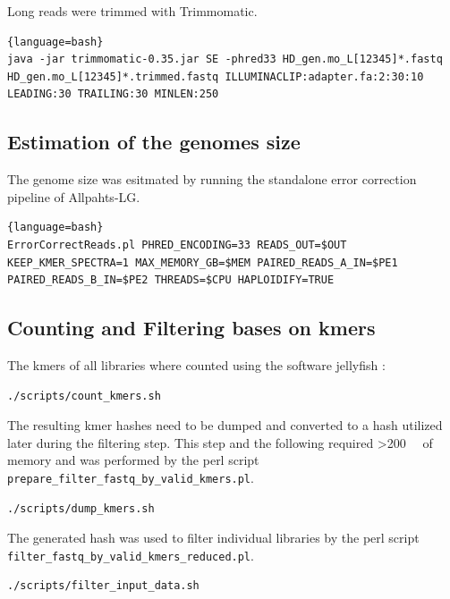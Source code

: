 \documentclass[12pt,a4paper]{scrartcl}
\begin{document}
Long reads were trimmed with Trimmomatic.

\begin{lstlisting}{language=bash}
java -jar trimmomatic-0.35.jar SE -phred33 HD_gen.mo_L[12345]*.fastq HD_gen.mo_L[12345]*.trimmed.fastq ILLUMINACLIP:adapter.fa:2:30:10 LEADING:30 TRAILING:30 MINLEN:250
\end{lstlisting}

\subsection*{Estimation of the genomes size}

The genome size was esitmated by running the standalone error correction pipeline of Allpahts-LG.

\begin{lstlisting}{language=bash}
ErrorCorrectReads.pl PHRED_ENCODING=33 READS_OUT=$OUT KEEP_KMER_SPECTRA=1 MAX_MEMORY_GB=$MEM PAIRED_READS_A_IN=$PE1 PAIRED_READS_B_IN=$PE2 THREADS=$CPU HAPLOIDIFY=TRUE
\end{lstlisting}

\subsection*{Counting and Filtering bases on kmers}

The kmers of all libraries where counted using the software jellyfish \parencite{Marcais2011}:

\begin{lstlisting}[language=bash]
./scripts/count_kmers.sh
\end{lstlisting}

The resulting kmer hashes need to be dumped and converted to a hash
utilized later during the filtering step. This step and the following
required \SI{>200}{\giga\byte} of memory and was performed by the perl
script \texttt{prepare\_filter\_fastq\_by\_valid\_kmers.pl}.

\begin{lstlisting}[language=bash]
./scripts/dump_kmers.sh
\end{lstlisting}

The generated hash was used to filter individual libraries by the perl
script \texttt{filter\_fastq\_by\_valid\_kmers\_reduced.pl}.

\begin{lstlisting}[language=bash]
./scripts/filter_input_data.sh
\end{lstlisting}
\end{document}
